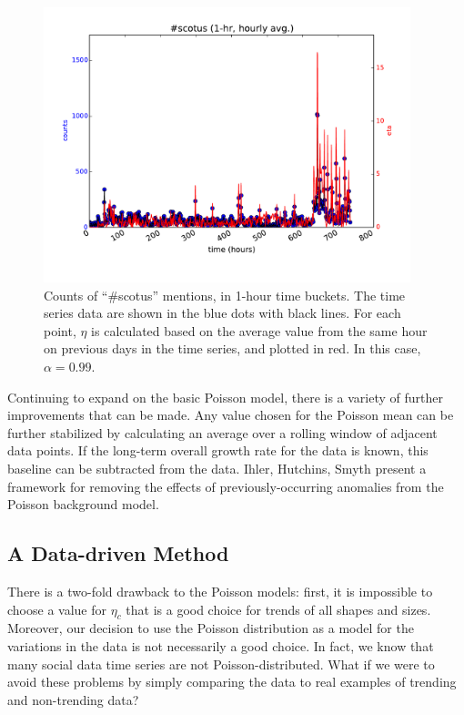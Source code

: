 \documentclass{article}
\begin{document}
\begin{figure}
\begin{center}
\includegraphics[width=0.95\textwidth]{fig/scotus_1month_ccpm.pdf}
\caption{Counts of ``\#scotus'' mentions, in 1-hour time buckets. The time series
data are shown in the blue dots with black lines. For each point, $\eta$ is
calculated based on the average value from the same hour on previous days
in the time series, and plotted in red. In this case, $\alpha=0.99$. }
\label{fig:scotus4}
\end{center}
\end{figure}

Continuing to expand on the basic Poisson model, there is a variety of
further improvements that can be made. Any value chosen for the Poisson
mean can be further stabilized by calculating an average over a rolling
window of adjacent data points. If the long-term overall growth rate for
the data is known, this baseline can be subtracted from the
data. Ihler, Hutchins, Smyth \cite{Ihler:2006} present a
framework for removing the effects of previously-occurring anomalies from
the Poisson background model. 



\subsection{A Data-driven Method} 
\label{nikolov}

There is a two-fold drawback to the Poisson models: first, it is impossible to
choose a value for $\eta_c$ that is a good choice for trends of all shapes
and sizes. Moreover, our decision to use the Poisson distribution as a model
for the variations in the data is not necessarily a good choice. In fact, we
know that many social data time series are not Poisson-distributed. What if we
were to avoid these problems by simply comparing the data to real examples of
trending and non-trending data?
\end{document}
